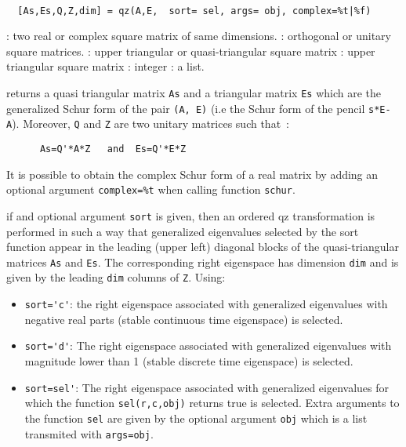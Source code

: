 \begin{mandesc}
   \\ %
\end{mandesc}
\begin{calling_sequence}
\begin{verbatim}
  [As,Es,Q,Z,dim] = qz(A,E,  sort= sel, args= obj, complex=%t|%f)
\end{verbatim}
\end{calling_sequence}
\begin{parameters}
  \begin{varlist}
    : two real or complex square matrix of same dimensions.
    : orthogonal or unitary square matrices.
    : upper triangular or quasi-triangular square matrix
    : upper triangular  square matrix
    : integer
    : a list.
  \end{varlist}
\end{parameters}
\begin{mandescription}
  returns a quasi triangular matrix \verb!As! and a triangular matrix
  \verb!Es! which are the generalized Schur form of the pair 
  \verb!(A, E)! (i.e the Schur form of the pencil \verb!s*E-A!). 
  Moreover, \verb!Q! and \verb!Z! are two unitary matrices such that~:
\begin{verbatim}
      As=Q'*A*Z   and  Es=Q'*E*Z 
\end{verbatim}

    It is possible to obtain the complex Schur form of a real matrix 
    by adding an optional argument \verb!complex=%t! when calling function
    \verb!schur!.

    if and optional argument \verb!sort! is given, then an ordered 
    qz transformation is performed in such a way that generalized eigenvalues 
    selected by the sort function appear in the leading (upper left) 
    diagonal blocks of the quasi-triangular matrices \verb!As! and 
    \verb!Es!. The corresponding right eigenspace 
    has dimension \verb!dim! and is given by the 
    leading \verb!dim! columns of \verb!Z!. Using:
    \begin{itemize}
      \item \verb!sort='c'!: the right  eigenspace associated with
      generalized eigenvalues with negative real parts (stable continuous time eigenspace) is selected.
      \item \verb!sort='d'!: The right eigenspace associated with
      generalized eigenvalues with magnitude lower than 1 (stable discrete time eigenspace) is selected.
      \item \verb!sort=sel'!: The right  eigenspace associated with
      generalized eigenvalues for which the function \verb!sel(r,c,obj)! returns true 
      is selected. Extra arguments to the function \verb!sel! are given 
      by the optional argument \verb!obj! which is a list transmited with \verb!args=obj!.
    \end{itemize}
  \end{mandescription}
